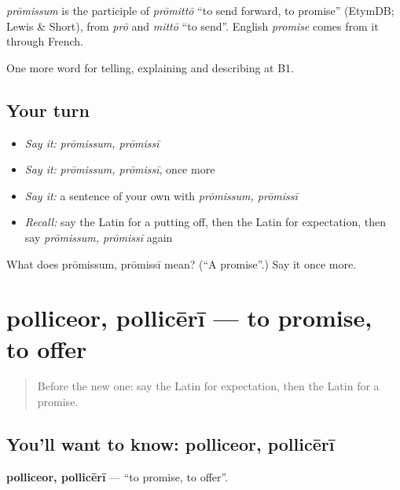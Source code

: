 \begin{cousinweb}
\emph{prōmissum} is the participle of \emph{prōmittō} \textquotedblleft{}to send forward, to promise\textquotedblright{} (EtymDB; Lewis \& Short), from \emph{prō} and \emph{mittō} \textquotedblleft{}to send\textquotedblright{}. English \emph{promise} comes from it through French.
\end{cousinweb}

\begin{grammarlens}[title={What you've built}]
One more word for telling, explaining and describing at B1.
\end{grammarlens}

\subsection*{Your turn}
\begin{itemize}
\raggedright
  \item \emph{Say it:} \emph{prōmissum, prōmissī}
  \item \emph{Say it:} \emph{prōmissum, prōmissī}, once more
  \item \emph{Say it:} a sentence of your own with \emph{prōmissum, prōmissī}
  \item \emph{Recall:} say the Latin for a putting off, then the Latin for expectation, then say \emph{prōmissum, prōmissī} again
\end{itemize}

\begin{tcolorbox}[breakable,colback=teal!4,colframe=teal!35!black,title={Before you move on}]
What does prōmissum, prōmissī mean? (\textquotedblleft{}A promise\textquotedblright{}.) Say it once more.
\end{tcolorbox}
\section[polliceor, pollicērī]{polliceor, pollicērī — to promise, to offer}

\label{lesson:LA-C396-polliceor}



\begin{quote}
Before the new one: say the Latin for expectation, then the Latin for a promise.
\end{quote}

\subsection*{You'll want to know: polliceor, pollicērī}
\textbf{polliceor, pollicērī} — \textquotedblleft{}to promise, to offer\textquotedblright{}.


